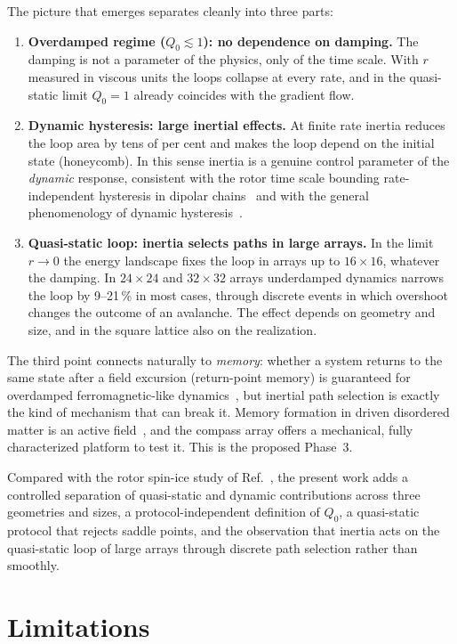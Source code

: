 \documentclass[11pt,a4paper]{article}
\begin{document}
The picture that emerges separates cleanly into three parts:
\begin{enumerate}[leftmargin=*]
\item \textbf{Overdamped regime ($Q_0\lesssim1$): no dependence on damping.} The damping is not a parameter of the physics, only of the time scale. With $r$ measured in viscous units the loops collapse at every rate, and in the quasi-static limit $Q_0=1$ already coincides with the gradient flow.
\item \textbf{Dynamic hysteresis: large inertial effects.} At finite rate inertia reduces the loop area by tens of per cent and makes the loop depend on the initial state (honeycomb). In this sense inertia is a genuine control parameter of the \emph{dynamic} response, consistent with the rotor time scale bounding rate-independent hysteresis in dipolar chains~\cite{concha2017} and with the general phenomenology of dynamic hysteresis~\cite{rao1990}.
\item \textbf{Quasi-static loop: inertia selects paths in large arrays.} In the limit $r\to0$ the energy landscape fixes the loop in arrays up to $16\times16$, whatever the damping. In $24\times24$ and $32\times32$ arrays underdamped dynamics narrows the loop by 9--21\,\% in most cases, through discrete events in which overshoot changes the outcome of an avalanche. The effect depends on geometry and size, and in the square lattice also on the realization.
\end{enumerate}
The third point connects naturally to \emph{memory}: whether a system returns to the same state after a field excursion (return-point memory) is guaranteed for overdamped ferromagnetic-like dynamics~\cite{sethna1993}, but inertial path selection is exactly the kind of mechanism that can break it. Memory formation in driven disordered matter is an active field~\cite{keim2019}, and the compass array offers a mechanical, fully characterized platform to test it. This is the proposed Phase~3.

Compared with the rotor spin-ice study of Ref.~\cite{mellado2012}, the present work adds a controlled separation of quasi-static and dynamic contributions across three geometries and sizes, a protocol-independent definition of $Q_0$, a quasi-static protocol that rejects saddle points, and the observation that inertia acts on the quasi-static loop of large arrays through discrete path selection rather than smoothly.

\section{Limitations}
\label{sec:limitations}
\end{document}
